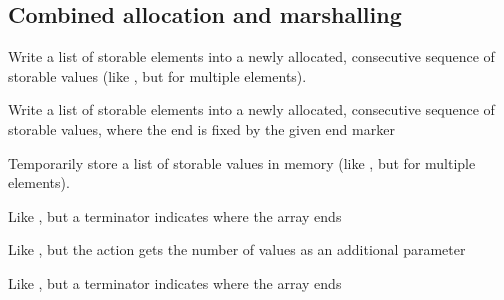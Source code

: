 \subsection{Combined allocation and marshalling}
\begin{haddockdesc}
\item[\begin{tabular}{@{}l}
newArray :: Storable a => {\char 91}a{\char 93} -> IO (Ptr a)
\end{tabular}]
{\haddockbegindoc
Write a list of storable elements into a newly allocated, consecutive
 sequence of storable values
 (like , but for multiple elements).\par}
\end{haddockdesc}
\begin{haddockdesc}
\item[\begin{tabular}{@{}l}
newArray0 :: Storable a => a -> {\char 91}a{\char 93} -> IO (Ptr a)
\end{tabular}]
{\haddockbegindoc
Write a list of storable elements into a newly allocated, consecutive
 sequence of storable values, where the end is fixed by the given end marker\par}
\end{haddockdesc}
\begin{haddockdesc}
\item[\begin{tabular}{@{}l}
withArray :: Storable a => {\char 91}a{\char 93} -> (Ptr a -> IO b) -> IO b
\end{tabular}]
{\haddockbegindoc
Temporarily store a list of storable values in memory
 (like , but for multiple elements).\par}
\end{haddockdesc}
\begin{haddockdesc}
\item[\begin{tabular}{@{}l}
withArray0 :: Storable a => a -> {\char 91}a{\char 93} -> (Ptr a -> IO b) -> IO b
\end{tabular}]
{\haddockbegindoc
Like , but a terminator indicates where the array ends\par}
\end{haddockdesc}
\begin{haddockdesc}
\item[\begin{tabular}{@{}l}
withArrayLen :: Storable a => {\char 91}a{\char 93} -> (Int -> Ptr a -> IO b) -> IO b
\end{tabular}]
{\haddockbegindoc
Like , but the action gets the number of values
 as an additional parameter\par}
\end{haddockdesc}
\begin{haddockdesc}
\item[\begin{tabular}{@{}l}
withArrayLen0 :: Storable a => a -> {\char 91}a{\char 93} -> (Int -> Ptr a -> IO b) -> IO b
\end{tabular}]
{\haddockbegindoc
Like , but a terminator indicates where the array ends\par}
\end{haddockdesc}
